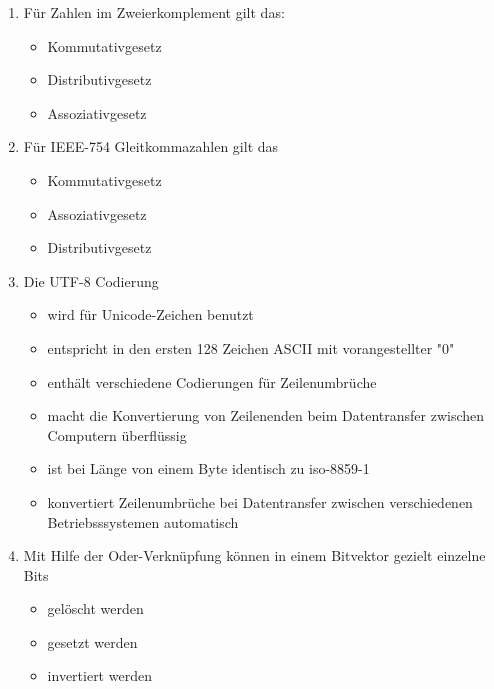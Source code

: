 \documentclass{exercisesheet}
\begin{document}
\begin{enumerate}
  \item Für Zahlen im Zweierkomplement gilt das:
        \begin{itemize}
          \item Kommutativgesetz \solution{\checkmark}
          \item Distributivgesetz \solution{\checkmark}
          \item Assoziativgesetz \solution{\checkmark}
        \end{itemize}
  \item Für IEEE-754 Gleitkommazahlen gilt das
        \begin{itemize}
          \item Kommutativgesetz \solution{\checkmark}
          \item Assoziativgesetz \solution{\xmark}
          \item Distributivgesetz \solution{\xmark}
        \end{itemize}
  \item Die UTF-8 Codierung
        \begin{itemize}
          \item wird für Unicode-Zeichen benutzt \solution{\checkmark}
          \item entspricht in den ersten 128 Zeichen ASCII mit vorangestellter "0" \solution{\checkmark}
          \item enthält verschiedene Codierungen für Zeilenumbrüche \solution{\checkmark}
          \item macht die Konvertierung von Zeilenenden beim Datentransfer zwischen Computern überflüssig \solution{\xmark}
          \item ist bei Länge von einem Byte identisch zu iso-8859-1 \solution{\checkmark}
          \item konvertiert Zeilenumbrüche bei Datentransfer zwischen verschiedenen Betriebsssystemen automatisch \solution{\xmark}
        \end{itemize}
  \item Mit Hilfe der Oder-Verknüpfung können in einem Bitvektor gezielt einzelne Bits
        \begin{itemize}
          \item gelöscht werden \solution{\xmark}
          \item gesetzt werden \solution{\checkmark}
          \item invertiert werden \solution{\xmark}

\end{itemize}
\end{enumerate}
\end{document}
